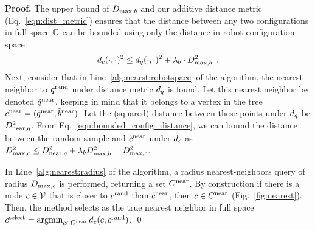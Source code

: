 \noindent
{\bf Proof.}
The upper bound of $D_{\textrm{max},b}$ and our additive distance metric (Eq.~\eqref{eqn:dist_metric}) ensures that the distance between any two configurations in full space $\mathbb{C}$ can be bounded using only the distance in robot configuration space:
\begin{equation}
    d_c(\cdot,\cdot)^2 \leq d_q(\cdot,\cdot)^2 + \lambda_b \cdot D_{\textrm{max},b}^2 \enspace .
    \label{eqn:bounded_config_distance}
\end{equation}
Next, consider that in Line~\ref{alg:nearst:robotspace} of the algorithm, the nearest neighbor to $q^\textrm{rand}$ under distance metric $d_q$ is found.  Let this nearest neighbor be denoted $\tilde{q}^\textrm{near}$, keeping in mind that it belongs to a vertex in the tree $\tilde{c}^\textrm{near} = (\tilde{q}^\textrm{near}, \tilde{b}^\textrm{near})$.  Let the (squared) distance between these points under $d_q$ be $D_{\textrm{near},q}^2$.  From Eq.~\eqref{eqn:bounded_config_distance}, we can bound the distance between the random sample and $\tilde{c}^\textrm{near}$ under $d_c$ as $D_{\textrm{max},c}^2 \leq D_{\textrm{near},q}^2 + \lambda_b D_{\textrm{max},b}^2 = D_{\textrm{max},c}^2$.

In Line~\ref{alg:nearest:radius} of the algorithm, a radius nearest-neighbors query of radius $D_{\textrm{max},c}$ is performed, returning a set $C^{\textrm{near}}$.  By construction if there is a node $c \in \mathcal{V}$ that is closer to $c^\textrm{rand}$ than $\tilde{c}^\textrm{near}$, then $c \in C^{\textrm{near}}$ (Fig.~\ref{fig:nearest}). Then, the method selects as the true nearest neighbor in full space $c^\textrm{select} = \operatorname*{argmin}_{c \in C^{\textrm{near}}}{d_c(c, c^\textrm{rand})}$.
\qed


